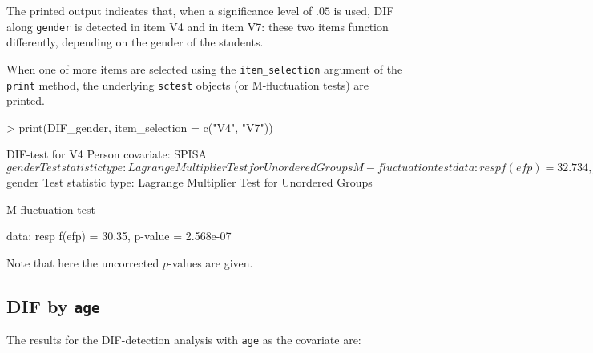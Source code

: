 \documentclass{article}
\begin{document}
The printed output indicates that, when a significance level of $.05$ is used, DIF along {\tt gender} is detected in item V4 and in item V7: these two items function differently, depending on the gender of the students.

When one of more items are selected using the {\tt item\_selection} argument of the {\tt print} method, the underlying {\tt sctest} objects (or M-fluctuation tests) are printed. 

\begin{Schunk}
\begin{Sinput}
> print(DIF_gender, item_selection = c("V4", "V7"))
\end{Sinput}
\begin{Soutput}
	DIF-test for V4
	Person covariate: SPISA$gender
	Test statistic type: Lagrange Multiplier Test for Unordered Groups

	M-fluctuation test

	data:  resp
	f(efp) = 32.734, p-value = 7.798e-08

	DIF-test for V7
	Person covariate: SPISA$gender
	Test statistic type: Lagrange Multiplier Test for Unordered Groups

	M-fluctuation test

	data:  resp
	f(efp) = 30.35, p-value = 2.568e-07
\end{Soutput}
\end{Schunk}

Note that here the uncorrected $p$-values are given.

\subsection{DIF by {\tt age}}
The results for the DIF-detection analysis with {\tt age} as the covariate are:

\begin{Schunk}
\end{Schunk}
\end{document}
